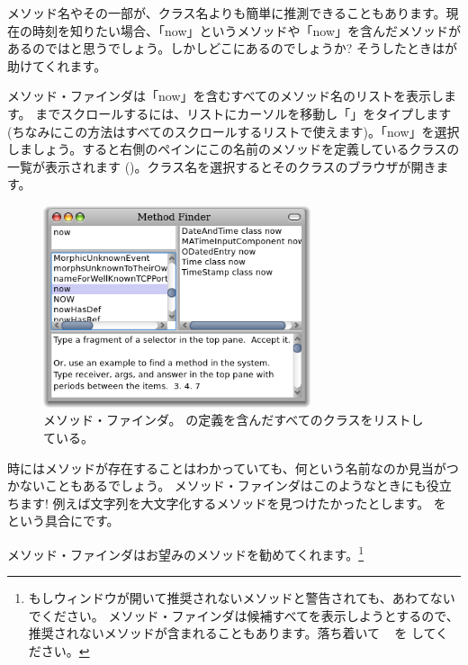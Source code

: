 \documentclass[a4paper,10pt,twoside]{book}
\begin{document}
メソッド名やその一部が、クラス名よりも簡単に推測できることもあります。現在の時刻を知りたい場合、「now」というメソッドや「now」を含んだメソッドがあるのではと思うでしょう。しかしどこにあるのでしょうか?
そうしたときはが助けてくれます。

メソッド・ファインダは「now」を含むすべてのメソッド名のリストを表示します。
 までスクロールするには、リストにカーソルを移動し「」をタイプします(ちなみにこの方法はすべてのスクロールするリストで使えます)。「now」を選択しましょう。すると右側のペインにこの名前のメソッドを定義しているクラスの一覧が表示されます ()。クラス名を選択するとそのクラスのブラウザが開きます。

\begin{figure}[hbt]
\centerline {\includegraphics[width=0.7\textwidth]{methodFinder-now}}
\caption{メソッド・ファインダ。 の定義を含んだすべてのクラスをリストしている。
}
\end{figure}

時にはメソッドが存在することはわかっていても、何という名前なのか見当がつかないこともあるでしょう。
メソッド・ファインダはこのようなときにも役立ちます! 例えば文字列を大文字化するメソッドを見つけたかったとします。 を  という具合にです。


\noindent
メソッド・ファインダはお望みのメソッドを勧めてくれます。\footnote{もしウィンドウが開いて推奨されないメソッドと警告されても、あわてないでください。 メソッド・ファインダは候補すべてを表示しようとするので、推奨されないメソッドが含まれることもあります。落ち着いて ~ を \click してください。}
\end{document}
